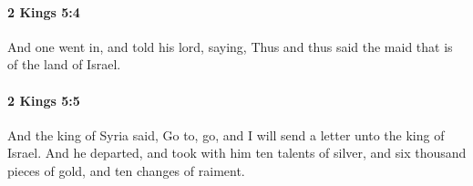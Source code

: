 		\paragraph{2 Kings 5:4} %
			\label{2KINGS-5-4}

			And one went in, and told his lord, saying, Thus and thus said the maid that is of the land of Israel.


		\paragraph{2 Kings 5:5} %
			\label{2KINGS-5-5}

			And the king of Syria said, Go to, go, and I will send a letter unto the king of Israel. And he departed, and took with him ten talents of silver, and six thousand pieces of gold, and ten changes of raiment.


